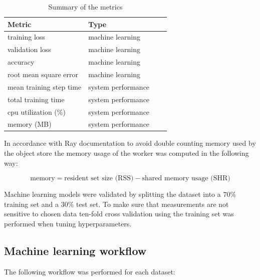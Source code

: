 \begin{table}[h]
    \centering
    \begin{tabular}{llll}
        \toprule
        Metric                  & Type               \\
        \midrule
        training loss           & machine learning   \\
        validation loss         & machine learning   \\
        accuracy                & machine learning   \\
        root mean square error  & machine learning   \\
        mean training step time & system performance \\
        total training time     & system performance \\
        cpu utilization (\%)    & system performance \\
        memory (MB)             & system performance \\
        \bottomrule
    \end{tabular}
    \caption{Summary of the metrics}
    \label{table:metrics}
\end{table}

In accordance with Ray documentation \parencite{therayteamMemoryManagementRay} to avoid double counting memory used by the object store the memory usage of the worker was computed in the following way:

\[ \text{memory} = \text{resident set size (RSS)} - \text{shared memory usage (SHR)} \]

Machine learning models were validated by splitting the dataset into a $70\%$ training set and a $30\%$ test set. To make sure that measurements are not sensitive to chosen data ten-fold cross validation using the training set was performed when tuning hyperparameters.



\subsection{Machine learning workflow}

The following workflow was performed for each dataset:

